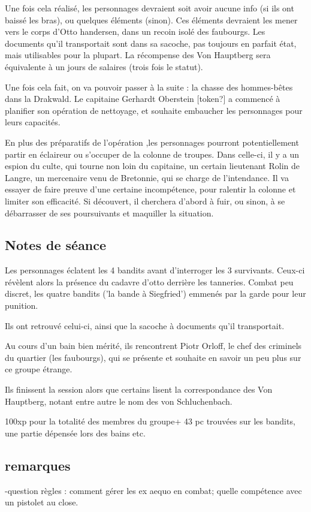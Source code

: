 \documentclass[10pt,a4paper]{book}
\begin{document}
Une fois cela réalisé, les personnages devraient soit avoir aucune info (si ils ont baissé les bras), ou quelques éléments (sinon). Ces éléments devraient les mener vers le corps d'Otto handersen, dans un recoin isolé des faubourgs. Les documents qu'il transportait sont dans sa sacoche, pas toujours en parfait état, mais utilisables pour la plupart. La récompense des Von Hauptberg sera équivalente à un jours de salaires (trois fois le statut).

Une fois cela fait, on va pouvoir passer à la suite : la chasse des hommes-bêtes dans la Drakwald. Le capitaine Gerhardt Oberstein [token?] a commencé à planifier son opération de nettoyage, et souhaite embaucher les personnages pour leurs capacités.

En plus des préparatifs de l'opération ,les personnages pourront potentiellement partir en éclaireur ou s'occuper de la colonne de troupes. Dans celle-ci, il y a un espion du culte, qui tourne non loin du capitaine, un certain lieutenant Rolin de Langre, un mercenaire venu de Bretonnie, qui se charge de l'intendance. Il va essayer de faire preuve d'une certaine incompétence, pour ralentir la colonne et limiter son efficacité. Si découvert, il cherchera d'abord à fuir, ou sinon, à se débarrasser de ses poursuivants et maquiller la situation.
\subsection{Notes de séance}
Les personnages éclatent les 4 bandits avant d'interroger les 3 survivants. Ceux-ci révèlent alors la présence du cadavre d'otto derrière les tanneries.  Combat peu discret, les quatre bandits ('la bande à Siegfried') emmenés par la garde pour leur punition.

Ils ont retrouvé celui-ci, ainsi que la sacoche à documents qu'il transportait. 

Au cours d'un bain bien mérité, ils rencontrent Piotr Orloff, le chef des criminels du quartier (les faubourgs), qui se présente et souhaite en savoir un peu plus sur ce groupe étrange.

Ils finissent la session alors que certains lisent la correspondance des Von Hauptberg, notant entre autre le nom des von Schluchenbach.

100xp pour la totalité des membres du groupe+ 43 pc trouvées sur les bandits, une partie dépensée lors des bains etc.
\subsection{remarques}
-question règles : comment gérer les ex aequo en combat; quelle compétence avec un pistolet au close.
\end{document}
